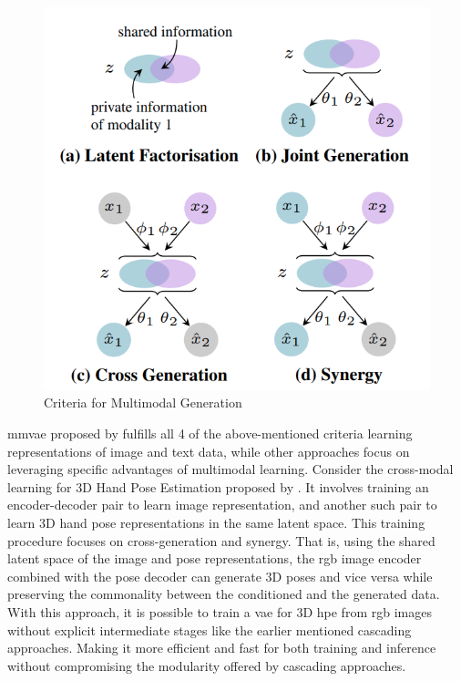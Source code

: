 \begin{figure}[!h]

    \centering

    \includegraphics[scale=0.4]{figures/criteria.png}

    \caption{Criteria for Multimodal Generation \cite{MMVAE}}

    \label{fig:criteria}

\end{figure}

\ac{mmvae} proposed by \cite{MMVAE} fulfills all 4 of the above-mentioned
criteria learning representations of image and text data, while other
approaches focus on leveraging specific advantages of multimodal learning.
Consider the cross-modal learning for 3D Hand Pose Estimation proposed by
\cite{crossmodal}. It involves training an encoder-decoder pair to learn
image representation, and another such pair to learn 3D hand pose
representations in the same latent space. This training procedure focuses
on cross-generation and synergy. That is, using the shared latent space of
the image and pose representations, the \ac{rgb} image encoder combined
with the pose decoder can generate 3D poses and vice versa while preserving
the commonality between the conditioned and the generated data. With this
approach, it is possible to train a \ac{vae} for 3D \ac{hpe} from \ac{rgb}
images without explicit intermediate stages like the earlier mentioned
cascading approaches. Making it more efficient and fast for both training
and inference without compromising the modularity offered by cascading
approaches.

